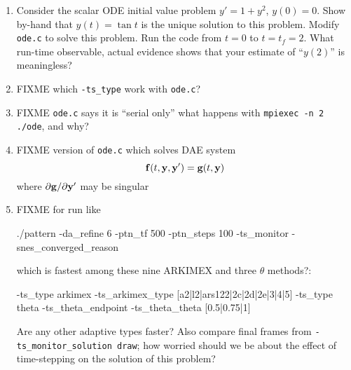\renewcommand{\labelenumi}{\arabic{chapter}.\arabic{enumi}\quad}
\renewcommand{\labelenumii}{(\alph{enumii})}
\begin{enumerate}
\item \label{exer:ts:tan}  Consider the scalar ODE initial value problem $y'=1+y^2$, $y(0)=0$.  Show by-hand that $y(t)=\tan t$ is the unique solution to this problem.  Modify \texttt{ode.c} to solve this problem.  Run the code from $t=0$ to $t=t_f=2$.  What run-time observable, actual evidence shows that your estimate of ``$y(2)$'' is meaningless?
\item FIXME which \texttt{-ts\_type} work with \texttt{ode.c}?
\item FIXME \texttt{ode.c} says it is ``serial only''  what happens with \texttt{mpiexec -n 2 ./ode}, and why?
\item FIXME version of \texttt{ode.c} which solves DAE system
    $$\mathbf{f}(t,\mathbf{y},\mathbf{y}') = \mathbf{g}(t,\mathbf{y})$$
where $\partial \mathbf{g}/\partial \mathbf{y}'$ may be singular
\item FIXME for run like
\begin{cline}
./pattern -da_refine 6 -ptn_tf 500 -ptn_steps 100 -ts_monitor -snes_converged_reason
\end{cline}
which is fastest among these nine ARKIMEX and three $\theta$ methods?:
\begin{code}
-ts_type arkimex -ts_arkimex_type [a2|l2|ars122|2c|2d|2e|3|4|5]
-ts_type theta -ts_theta_endpoint -ts_theta_theta [0.5|0.75|1]
\end{code}
Are any other adaptive \pTS types faster?  Also compare final frames from \texttt{-ts\_monitor\_solution draw}; how worried should we be about the effect of time-stepping on the solution of this problem?
\end{enumerate}
